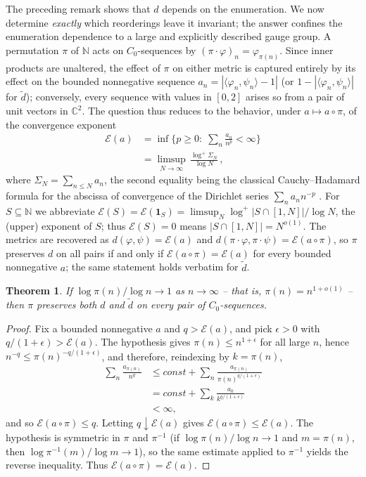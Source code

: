 \documentclass[twoside,11pt,letter]{article}
\def\bC{\mathbb{C}}
\def\bN{\mathbb{N}}
\newcommand{\cexp}{\mathcal{E}}  %
\newtheorem{theorem}{Theorem}[section]
\theoremstyle{definition}
\theoremstyle{definition}
\theoremstyle{plain}
\begin{document}
The preceding remark shows that $d$ depends on the enumeration. We now determine \emph{exactly} which reorderings leave it invariant; the answer confines the enumeration dependence to a large and explicitly described gauge group. A permutation $\pi$ of $\bN$ acts on $C_0$-sequences by $(\pi\cdot\varphi)_n=\varphi_{\pi(n)}$. Since inner products are unaltered, the effect of $\pi$ on either metric is captured entirely by its effect on the bounded nonnegative sequence $a_n=|\langle\varphi_n,\psi_n\rangle-1|$ (or $1-|\langle\varphi_n,\psi_n\rangle|$ for $\tilde d$); conversely, every sequence with values in $[0,2]$ arises so from a pair of unit vectors in $\bC^2$. The question thus reduces to the behavior, under $a\mapsto a\circ\pi$, of the convergence exponent
\begin{equation}\label{rhoDef}
\begin{split}
\cexp(a)&=\inf\Big\{p\geq 0:\;\sum_n \frac{a_n}{n^{p}}<\infty\Big\}\\
&=\limsup_{N\to\infty}\,\frac{\log^+\Sigma_N}{\log N}\,,
\end{split}
\end{equation}
where $\Sigma_N=\sum_{n\leq N}a_n$, 
the second equality being the classical Cauchy--Hadamard formula for the abscissa of convergence of the Dirichlet series $\sum_n a_n n^{-p}$ \cite{HR15}. For $S\subseteq\bN$ we abbreviate $\cexp(S)=\cexp(\mathbf 1_S)=\limsup_N\log^+|S\cap[1,N]|/\log N$, the (upper) exponent of $S$; thus $\cexp(S)=0$ means $|S\cap[1,N]|=N^{o(1)}$. The metrics are recovered as $d(\varphi,\psi)=\cexp(a)$ and $d(\pi\cdot\varphi,\pi\cdot\psi)=\cexp(a\circ\pi)$, so $\pi$ preserves $d$ on all pairs if and only if $\cexp(a\circ\pi)=\cexp(a)$ for every bounded nonnegative $a$; the same statement holds verbatim for $\tilde d$.

\begin{theorem}\label{reindexSuff}
If $\log\pi(n)/\log n\to1$ as $n\to\infty$ -- that is, $\pi(n)=n^{1+o(1)}$ -- then $\pi$ preserves both $d$ and $\tilde d$ on every pair of $C_0$-sequences.
\end{theorem}
\begin{proof}
Fix a bounded nonnegative $a$ and $q>\cexp(a)$, and pick $\epsilon>0$ with $q/(1+\epsilon)>\cexp(a)$. The hypothesis gives $\pi(n)\leq n^{1+\epsilon}$ for all large $n$, hence $n^{-q}\leq\pi(n)^{-q/(1+\epsilon)}$, and therefore, reindexing by $k=\pi(n)$,
\begin{equation*}
\begin{split}
\sum_n \frac{a_{\pi(n)}}{n^{q}}&\leq const+\sum_n \frac{a_{\pi(n)}}{\pi(n)^{q/(1+\epsilon)}}\\
&= const+\sum_k \frac{a_k}{k^{q/(1+\epsilon)}}\\
&<\infty,
\end{split}
\end{equation*}
and so $\cexp(a\circ\pi)\leq q$. Letting $q\downarrow\cexp(a)$ gives $\cexp(a\circ\pi)\leq\cexp(a)$. The hypothesis is symmetric in $\pi$ and $\pi^{-1}$ (if $\log\pi(n)/\log n\to1$ and $m=\pi(n)$, then $\log\pi^{-1}(m)/\log m\to1$), so the same estimate applied to $\pi^{-1}$ yields the reverse inequality. Thus $\cexp(a\circ\pi)=\cexp(a)$.
\end{proof}
\end{document}
